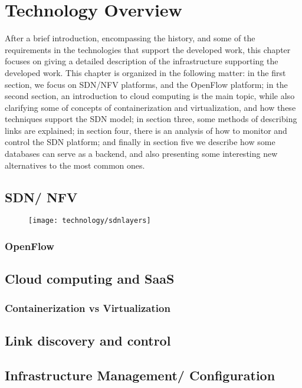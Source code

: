 \chapter{Technology Overview} \label{chap:tech} %
\hspace {5mm}

After a brief introduction, encompassing the history, and some of the requirements in the technologies that support the developed work, this chapter focuses on giving a detailed description of the infrastructure supporting 
the developed work. This chapter is organized in the following matter: in the first section, we focus on SDN/NFV platforms, and the OpenFlow platform; in the second section, an introduction to cloud computing is the main topic,
while also clarifying some of concepts of containerization and virtualization, and how these techniques support the SDN model; in section three, some methods of describing links are explained; in section four, there is an 
analysis of how to monitor and control the SDN platform; and finally in section five we describe how some databases can serve as a backend, and also presenting some interesting new alternatives to the most common ones.

\section {SDN/ NFV}


\begin{figure}[!tbph]
  \centering
  {\texttt{[image: technology/sdnlayers]}\label{fig:net_trad}}
\end{figure}

\subsection {OpenFlow}
\section {Cloud computing and SaaS}
\subsection {Containerization vs Virtualization}
\section {Link discovery and control}
\section {Infrastructure Management/ Configuration}

